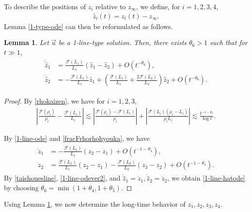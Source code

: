 \documentclass[reqno]{amsart}
\theoremstyle{plain}
\newtheorem{lemma}[theorem]{Lemma}
\theoremstyle{definition}
\numberwithin{equation}{section}
\begin{document}
To describe the positions of $z_i$ relative to $z_{\infty}$, we define, for $i=1,2,3,4$,
\begin{align}\label{hatzdef}
\hat{z}_i(t)=z_i(t)-z_{\infty}.
\end{align}
Lemma \ref{1-type-ode} can then be reformulated as follows.
\begin{lemma}\label{1-type-odekaizen5}
Let $\vec{u}$ be a 1-line-type solution. Then, there exists $\theta_6>1$ such that for $t\gg 1$,
\begin{align}\label{1-line-hatode}
\begin{aligned}
\dot{\hat{z}}_1&=\frac{\mathcal{F}(L_1)}{L_1}\left(\hat{z}_1-\hat{z}_2\right)+O\left(t^{-\theta_6}\right),
\\
\dot{\hat{z}}_2&=-\frac{\mathcal{F}(L_1)}{L_1}\hat{z}_1+\left(\frac{\mathcal{F}(L_1)}{L_1}+\frac{2\mathcal{F}(L_2)}{L_2}\right)\hat{z}_2+O\left(t^{-\theta_6}\right).
\end{aligned}
\end{align}
\end{lemma}

\begin{proof}
By \eqref{rhokaizen}, we have for $i=1,2,3$,
\begin{align}\label{fracFrhorhohyouka}
\left|\frac{\mathcal{F}(\rho_i)}{\rho_i}-\frac{\mathcal{F}(L_i)}{L_i}\right|\lesssim \left|\frac{\mathcal{F}(\rho_i)-\mathcal{F}(L_i)}{\rho_i}\right|+\left|\frac{\mathcal{F}(L_i)(\rho_i-L_i)}{\rho_iL_i}\right|\lesssim \frac{t^{-1-\theta_4}}{\log{t}}.
\end{align}

By \eqref{1-line-ode} and \eqref{fracFrhorhohyouka}, we have
\begin{align}\label{1-line-odever2}
\begin{aligned}
\dot{z}_1&=-\frac{\mathcal{F}(L_1)}{L_1}\left(z_2-z_1\right)+O\left(t^{-1-\theta_4}\right),
\\
\dot{z}_2&=\frac{\mathcal{F}(L_1)}{L_1}\left(z_2-z_1\right)-\frac{\mathcal{F}(L_2)}{L_2}\left(z_3-z_2\right)+O\left(t^{-1-\theta_4}\right).
\end{aligned}
\end{align}
By \eqref{taishouesline}, \eqref{1-line-odever2}, and $\dot{\hat{z}}_1=\dot{z}_1,\dot{\hat{z}}_2=\dot{z}_2$, we obtain \eqref{1-line-hatode} by choosing $\theta_6=\min{(1+\theta_4,1+\theta_5)}$.


\end{proof}


Using Lemma \ref{1-type-odekaizen5}, we now determine the long-time behavior of $z_1,z_2,z_3,z_4$.
\end{document}
